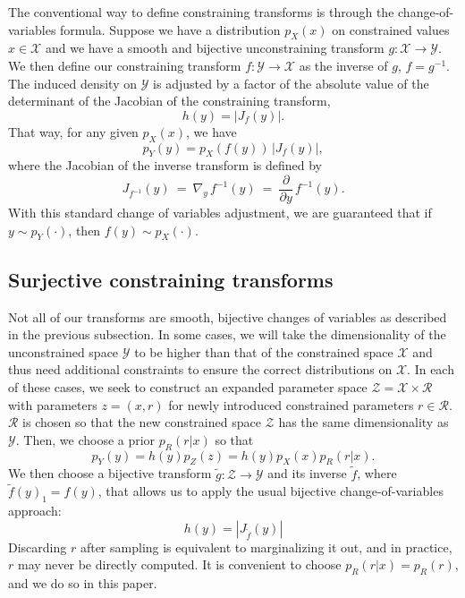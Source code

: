 \documentclass[11pt]{article}
\newcommand{\abs}[1]{\left| #1 \right|}
\newcommand{\absdet}[1]{\abs{#1}}
\begin{document}
The conventional way to define constraining transforms is through the change-of-variables formula.  Suppose we have a distribution $p_X(x)$ on constrained values $x \in \mathcal{X}$ and we have a smooth and bijective unconstraining transform $g : \mathcal{X} \rightarrow \mathcal{Y}$.  We then define our constraining transform $f : \mathcal{Y} \rightarrow \mathcal{X}$ as the inverse of $g$, $f = g^{-1}$.  The induced density on $\mathcal{Y}$ is adjusted by a factor of the absolute value of the determinant of the Jacobian of the constraining transform,
\[
h(y) = \absdet{J_f(y)}.
\]
That way, for any given $p_X(x)$, we have
\[
p_Y(y) = p_X(f(y)) \, \absdet{J_f(y)},
\]
where the Jacobian of the inverse transform is defined by
\[
  J_{f^{-1}}(y) \ = \ \nabla_y \, f^{-1}(y) \ = \ \frac{\partial}{\partial y} \, f^{-1}(y).
\]
With this standard change of variables adjustment, we are guaranteed that if $y \sim p_Y(\cdot)$, then $f(y) \sim p_X(\cdot)$.

\subsection{Surjective constraining transforms}

Not all of our transforms are smooth, bijective changes of variables as described in the previous subsection.  In some cases, we will take the dimensionality of the unconstrained space $\mathcal{Y}$ to be higher than that of the constrained space $\mathcal{X}$ and thus need additional constraints to ensure the correct distributions on $\mathcal{X}$.
In each of these cases, we seek to construct an expanded parameter space $\mathcal{Z} = \mathcal{X} \times \mathcal{R}$ with parameters $z = (x, r)$ for newly introduced constrained parameters $r \in \mathcal{R}$.
$\mathcal{R}$ is chosen so that the new constrained space $\mathcal{Z}$ has the same dimensionality as $\mathcal{Y}$.
Then, we choose a prior $p_R(r | x)$ so that
\[
p_Y(y) = h(y) p_Z(z) = h(y) p_X(x) p_R(r | x).
\]
We then choose a bijective transform $\tilde{g}: \mathcal{Z} \to \mathcal{Y}$ and its inverse $\tilde{f}$, where $\tilde{f}(y)_1 = f(y)$, that allows us to apply the usual bijective change-of-variables approach:
\[
h(y) = |J_{\tilde{f}}(y)|
\]
Discarding $r$ after sampling is equivalent to marginalizing it out, and in practice, $r$ may never be directly computed.
It is convenient to choose $p_R(r | x) = p_R(r)$, and we do so in this paper. 

\end{document}
